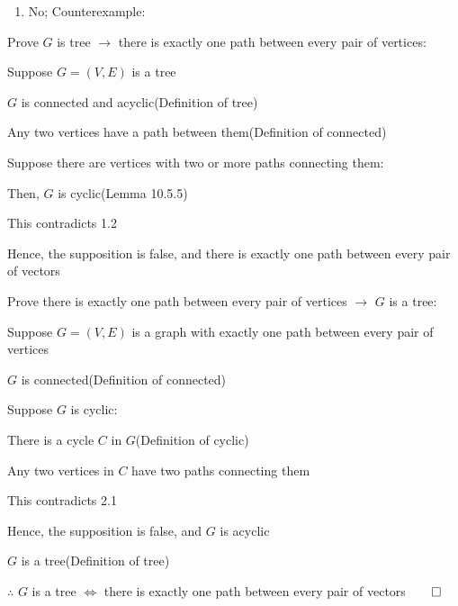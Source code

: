 \documentclass[12pt, a4paper]{article}
\begin{document}
\begin{enumerate}[Q\arabic*.]
\begin{enumerate}[(\alph*)]
      \item No; Counterexample:\\\quad\quad\quad\quad\quad\quad\quad\quad{}
    \end{enumerate}
  \pagebreak
  \item 
    \begin{enumproof}
    \item Prove $G$ is tree $\rightarrow$ there is exactly one path between every pair of vertices:
      \begin{enumproof}
      \item Suppose $G = (V, E)$ is a tree
      \item $G$ is connected and acyclic\hfill(Definition of tree)
      \item Any two vertices have a path between them\hfill(Definition of connected)
      \item Suppose there are vertices with two or more paths connecting them:
      \begin{enumproof}
        \item Then, $G$ is cyclic\hfill(Lemma 10.5.5)
        \item This contradicts 1.2
      \end{enumproof}
      \item Hence, the supposition is false, and there is exactly one path between every pair of vectors 
      \end{enumproof}
    \item Prove there is exactly one path between every pair of vertices $\rightarrow$ $G$ is a tree:
      \begin{enumproof}
      \item Suppose $G = (V, E)$ is a graph with exactly one path between every pair of vertices
      \item $G$ is connected\hfill(Definition of connected)
      \item Suppose $G$ is cyclic:
        \begin{enumproof}
        \item There is a cycle $C$ in $G$\hfill(Definition of cyclic)
        \item Any two vertices in $C$ have two paths connecting them
        \item This contradicts 2.1
        \end{enumproof}
      \item Hence, the supposition is false, and $G$ is acyclic
      \item $G$ is a tree\hfill(Definition of tree)
      \end{enumproof}
    \item $\therefore$ $G$ is a tree $\iff$ there is exactly one path between every pair of vectors$\qed$
    \end{enumproof}


\end{enumerate}
\end{document}
